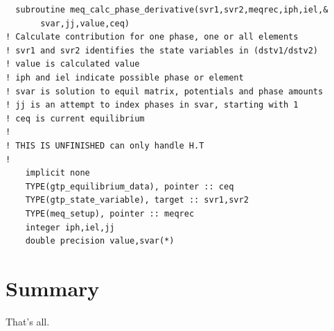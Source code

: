 \documentclass[12pt]{article}
\begin{document}
{\small
\begin{verbatim}
  subroutine meq_calc_phase_derivative(svr1,svr2,meqrec,iph,iel,&
       svar,jj,value,ceq)
! Calculate contribution for one phase, one or all elements
! svr1 and svr2 identifies the state variables in (dstv1/dstv2)
! value is calculated value
! iph and iel indicate possible phase or element
! svar is solution to equil matrix, potentials and phase amounts
! jj is an attempt to index phases in svar, starting with 1
! ceq is current equilibrium
!
! THIS IS UNFINISHED can only handle H.T
!
    implicit none
    TYPE(gtp_equilibrium_data), pointer :: ceq
    TYPE(gtp_state_variable), target :: svr1,svr2
    TYPE(meq_setup), pointer :: meqrec
    integer iph,iel,jj
    double precision value,svar(*)
\end{verbatim}
}

\section{Summary}

That's all.
\end{document}
